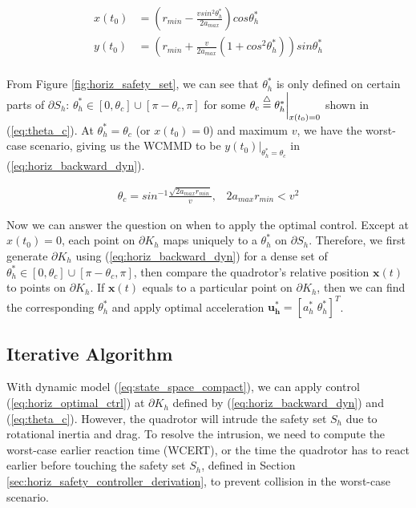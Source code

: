 \documentclass[journal,11pt,onecolumn,draftclsnofoot,]{IEEEtran}
\begin{document}
\begin{equation}
\label{eq:horiz_backward_dyn}
\begin{split}
x(t_0) &= \left( r_{min} - \frac{vsin^2\theta_h^*}{2a_{max}} \right) cos\theta_h^* \\
y(t_0) &= \left( r_{min} + \frac{v}{2a_{max}} \left( 1+cos^2\theta_h^* \right) \right) sin\theta_h^* \\
\end{split}
\end{equation}


From Figure \ref{fig:horiz_safety_set}, we can see that $\theta_h^*$ is only defined on certain parts of $\partial S_h$: $\theta_h^*\in[0,\theta_c] \cup [\pi-\theta_c,\pi]$ for some $\theta_c \buildrel\triangle\over = \theta_h^* \bigg|_{x(t_0)=0}$ shown in (\ref{eq:theta_c}). At $\theta_h^*=\theta_c$ (or $x(t_0)=0$) and maximum $v$, we have the worst-case scenario, giving us the WCMMD to be $y(t_0) \bigg|_{\theta_h^*=\theta_c}$ in (\ref{eq:horiz_backward_dyn}).

\begin{equation}
\label{eq:theta_c}
\begin{split}
\theta_c = sin^{-1}\frac{\sqrt{2a_{max}r_{min}}}{v}, \;\;\; 2a_{max}r_{min}<v^2
\end{split}
\end{equation}

Now we can answer the question on when to apply the optimal control. Except at $x(t_0)=0$, each point on $\partial K_h$ maps uniquely to a $\theta_h^*$ on $\partial S_h$. Therefore, we first generate $\partial K_h$ using (\ref{eq:horiz_backward_dyn}) for a dense set of $\theta_h^*\in[0,\theta_c] \cup [\pi-\theta_c,\pi]$, then compare the quadrotor's relative position $\boldsymbol{x}(t)$ to points on $\partial K_h$. If $\boldsymbol{x}(t)$  equals to a particular point on $\partial K_h$, then we can find the corresponding $\theta_h^*$ and apply  optimal acceleration $\boldsymbol{u_h^*}=[a_h^* \; \theta_h^* ]^T$. 

\subsection{Iterative Algorithm} \label{sec:iter_alg}

With dynamic model (\ref{eq:state_space_compact}), we can apply control (\ref{eq:horiz_optimal_ctrl}) at $\partial K_h$ defined by (\ref{eq:horiz_backward_dyn}) and (\ref{eq:theta_c}). However, the quadrotor will intrude the safety set $S_h$ due to rotational inertia and drag. To resolve the intrusion, we need to compute the worst-case earlier reaction time (WCERT), or the time the quadrotor has to react earlier before touching the safety set $S_h$, defined in Section \ref{sec:horiz_safety_controller_derivation}, to prevent collision in the worst-case scenario.
\end{document}
